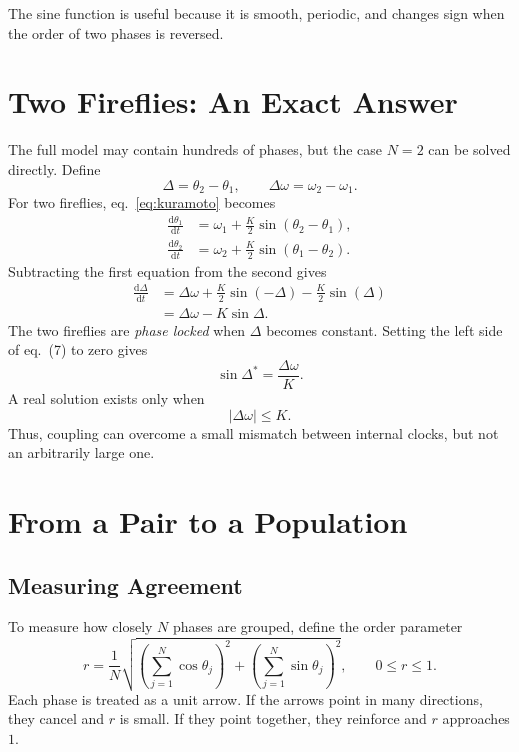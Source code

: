 \documentclass[11pt]{article}
\begin{document}
The sine function is useful because it is smooth, periodic, and changes sign when
the order of two phases is reversed.

\section{Two Fireflies: An Exact Answer}
The full model may contain hundreds of phases, but the case $N = 2$ can be solved
directly. Define
\[
    \Delta = \theta_2 - \theta_1, \qquad \Delta\omega = \omega_2 - \omega_1.
\]
For two fireflies, eq.~\eqref{eq:kuramoto} becomes
\begin{align}
    \frac{\mathrm{d}\theta_1}{\mathrm{d}t} &= \omega_1 + \frac{K}{2}\sin(\theta_2-\theta_1), \\
    \frac{\mathrm{d}\theta_2}{\mathrm{d}t} &= \omega_2 + \frac{K}{2}\sin(\theta_1-\theta_2).
\end{align}
Subtracting the first equation from the second gives
\begin{align}
    \frac{\mathrm{d}\Delta}{\mathrm{d}t}
        &= \Delta\omega + \frac{K}{2}\sin(-\Delta) - \frac{K}{2}\sin(\Delta) \\
        &= \Delta\omega - K\sin\Delta.
\end{align}
The two fireflies are \emph{phase locked} when $\Delta$ becomes constant. Setting
the left side of eq.~(7) to zero gives
\begin{equation}
    \sin\Delta^* = \frac{\Delta\omega}{K}.
\end{equation}
A real solution exists only when
\begin{equation}
    \boxed{|\Delta\omega| \le K.}
\end{equation}
Thus, coupling can overcome a small mismatch between internal clocks, but not an
arbitrarily large one.

\section{From a Pair to a Population}

\subsection{Measuring Agreement}
To measure how closely $N$ phases are grouped, define the order parameter
\begin{equation}
    r = \frac{1}{N}\sqrt{\left(\sum_{j=1}^{N}\cos\theta_j\right)^2
                       + \left(\sum_{j=1}^{N}\sin\theta_j\right)^2},
        \qquad 0 \le r \le 1.
\end{equation}
Each phase is treated as a unit arrow. If the arrows point in many directions,
they cancel and $r$ is small. If they point together, they reinforce and $r$
approaches $1$.
\end{document}
